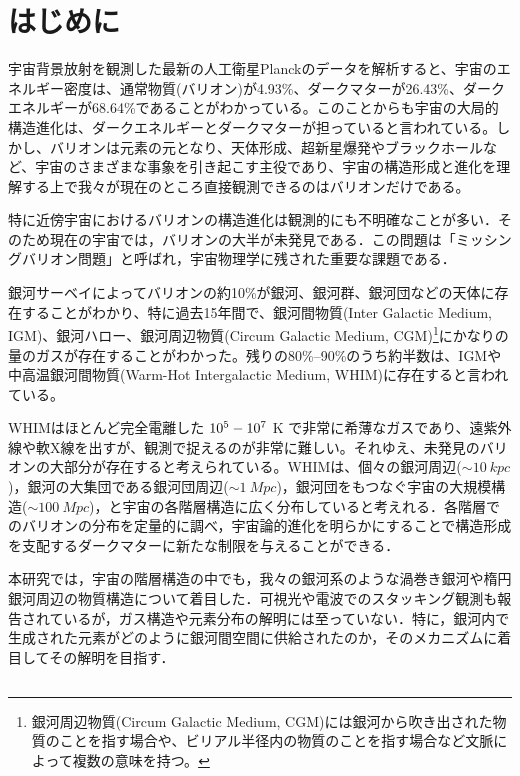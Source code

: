 \chapter{はじめに}

宇宙背景放射を観測した最新の人工衛星Planckのデータを解析すると、宇宙のエネルギー密度は、通常物質(バリオン)が4.93\%、ダークマターが26.43\%、ダークエネルギーが68.64\%であることがわかっている\citep{planck_collaboration_planck_2021}。このことからも宇宙の大局的構造進化は、ダークエネルギーとダークマターが担っていると言われている。しかし、バリオンは元素の元となり、天体形成、超新星爆発やブラックホールなど、宇宙のさまざまな事象を引き起こす主役であり、宇宙の構造形成と進化を理解する上で我々が現在のところ直接観測できるのはバリオンだけである。

特に近傍宇宙におけるバリオンの構造進化は観測的にも不明確なことが多い．そのため現在の宇宙では，バリオンの大半が未発見である\citep{shull_baryon_2012}．この問題は「ミッシングバリオン問題」と呼ばれ，宇宙物理学に残された重要な課題である．

銀河サーベイによってバリオンの約10\%が銀河、銀河群、銀河団などの天体に存在することがわかり、特に過去15年間で、銀河間物質(Inter Galactic Medium, IGM)、銀河ハロー、銀河周辺物質(Circum Galactic Medium, CGM)\footnote{銀河周辺物質(Circum Galactic Medium, CGM)には銀河から吹き出された物質のことを指す場合や、ビリアル半径内の物質のことを指す場合など文脈によって複数の意味を持つ。}にかなりの量のガスが存在することがわかった。残りの80\%--90\%のうち約半数は、IGMや中高温銀河間物質(Warm-Hot Intergalactic Medium, WHIM)に存在すると言われている\citep{shull_baryon_2012,danforth_low-z_2008}。

WHIMはほとんど完全電離した $10^5\--10^7$ K で非常に希薄なガスであり、遠紫外線や軟X線を出すが、観測で捉えるのが非常に難しい。それゆえ、未発見のバリオンの大部分が存在すると考えられている。WHIMは、個々の銀河周辺($\sim\SI{10}{kpc}$)，銀河の大集団である銀河団周辺($\sim\SI{1}{Mpc}$)，銀河団をもつなぐ宇宙の大規模構造($\sim\SI{100}{Mpc}$)，と宇宙の各階層構造に広く分布していると考えれる．各階層でのバリオンの分布を定量的に調べ，宇宙論的進化を明らかにすることで構造形成を支配するダークマターに新たな制限を与えることができる．

本研究では，宇宙の階層構造の中でも，我々の銀河系のような渦巻き銀河や楕円銀河周辺の物質構造について着目した．可視光や電波でのスタッキング観測も報告されているが\citep{tanimura_search_2019}，ガス構造や元素分布の解明には至っていない．特に，銀河内で生成された元素がどのように銀河間空間に供給されたのか，そのメカニズムに着目してその解明を目指す．




\section{}